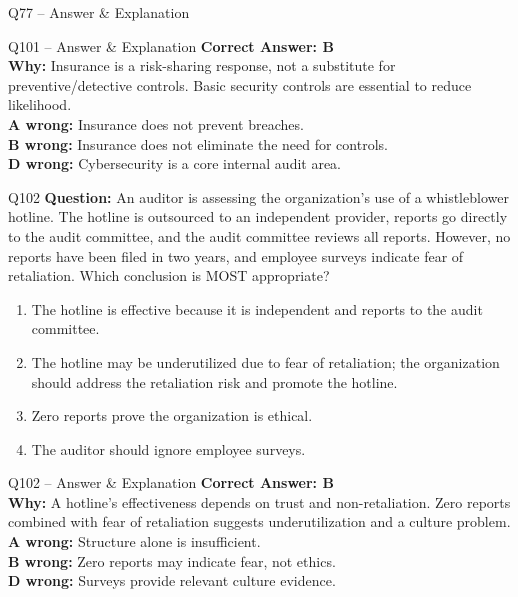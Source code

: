 \documentclass[aspectratio=169,10pt]{beamer}
\begin{document}
\begin{frame}[t]{Q77 -- Answer \& Explanation}
	\begin{frame}[t]{Q101 -- Answer \& Explanation}
		\small
		\textbf{Correct Answer: B} \\[4pt]
		\textbf{Why:} Insurance is a risk-sharing response, not a substitute for preventive/detective controls. Basic security controls are essential to reduce likelihood. \\[4pt]
		\textbf{A wrong:} Insurance does not prevent breaches. \\[2pt]
		\textbf{B wrong:} Insurance does not eliminate the need for controls. \\[2pt]
		\textbf{D wrong:} Cybersecurity is a core internal audit area.
	\end{frame}
	
	\begin{frame}[t]{Q102}
		\small
		\textbf{Question:} An auditor is assessing the organization's use of a whistleblower hotline. The hotline is outsourced to an independent provider, reports go directly to the audit committee, and the audit committee reviews all reports. However, no reports have been filed in two years, and employee surveys indicate fear of retaliation. Which conclusion is MOST appropriate?
		\begin{enumerate}[label=\Alph*.,itemsep=1pt,topsep=2pt]
			\item The hotline is effective because it is independent and reports to the audit committee.
			\item The hotline may be underutilized due to fear of retaliation; the organization should address the retaliation risk and promote the hotline.
			\item Zero reports prove the organization is ethical.
			\item The auditor should ignore employee surveys.
		\end{enumerate}
	\end{frame}
	
	\begin{frame}[t]{Q102 -- Answer \& Explanation}
		\small
		\textbf{Correct Answer: B} \\[4pt]
		\textbf{Why:} A hotline's effectiveness depends on trust and non-retaliation. Zero reports combined with fear of retaliation suggests underutilization and a culture problem. \\[4pt]
		\textbf{A wrong:} Structure alone is insufficient. \\[2pt]
		\textbf{B wrong:} Zero reports may indicate fear, not ethics. \\[2pt]
		\textbf{D wrong:} Surveys provide relevant culture evidence.
	\end{frame}
	

\end{frame}
\end{document}
